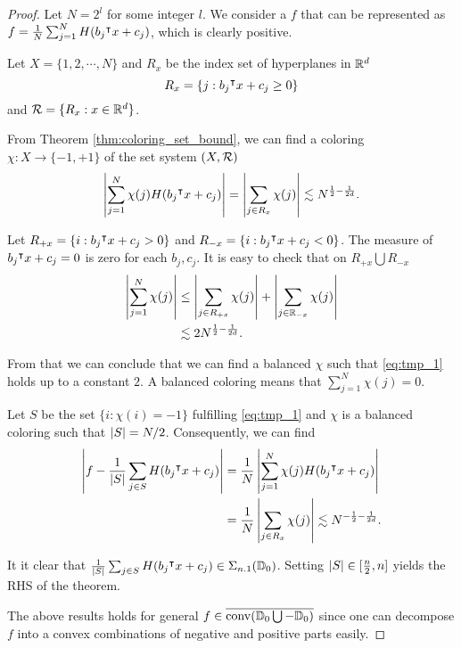 \begin{proof}
    Let $N = 2^l$ for some integer $l$. We consider a $f$ that can be
    represented as $f = \frac{1}{N}\sum_{j=1}^N H(b_j{}^{\intercal} x + c_j)$, which is
    clearly positive.

    Let $X=\{1,2,\cdots,N\}$ and $R_x$   be the index set of hyperplanes in $\mathbb{R}^d$
    \begin{equation}
        R_x = \{j: b_j{}^{\intercal} x+c_j \geq 0\}
    \end{equation}
    and $\mathcal{R} = \{R_x: x\in\mathbb{R}^d\}$.

    From Theorem \ref{thm:coloring_set_bound}, we can find a coloring $\chi: X
    \to \{-1,+1\}$ of the set system $(X, \mathcal{R})$
    \begin{equation}
        \label{eq:tmp_1}
        \left| \sum_{j=1}^N \chi(j) H(b_j{}^{\intercal} x + c_j) \right| = 
        \left| \sum_{j\in R_x} \chi(j) \right| \lesssim N^{\frac{1}{2}-\frac{1}{2d}}.
    \end{equation}

    Let $R_{+x} = \{i: b_j{}^{\intercal} x + c_j > 0\}$ and $R_{-x} = \{i: b_j{}^{\intercal} x + c_j <
    0\}$. The measure of $b_j{}^{\intercal} x + c_j = 0$ is zero for each $b_j, c_j$. It is
    easy to check that on $R_{+x} \bigcup R_{-x}$ 
    \begin{align}
        \left| \sum_{j=1}^N \chi(j) \right| 
        &\leq \left| \sum_{j\in R_{+x}} \chi(j) \right| + 
        \left| \sum_{j\in\mathbb{R}_{-x}} \chi(j) \right| \\
        &\lesssim 2 N^{\frac{1}{2}-\frac{1}{2d}}.
    \end{align}

    From that we can conclude that we can find a balanced $\chi$ such that
    \eqref{eq:tmp_1} holds up to a constant $2$. A balanced coloring means that
    $\sum_{j=1}^N \chi(j) = 0$.

    Let $S$ be the set $\{i: \chi(i) = -1\}$ fulfilling \eqref{eq:tmp_1} and
    $\chi$ is a balanced coloring such that $\left| S \right|=N/2$. Consequently, we can
    find 
    \begin{align}
        \left| f - \frac{1}{\left| S \right|}\sum_{j\in S}H(b_j{}^{\intercal} x+c_j) \right|
        &= \frac{1}{N} \left| \sum_{j=1}^N\chi(j) H(b_j{}^{\intercal} x + c_j) \right| \\
        &= \frac{1}{N} \left| \sum_{j\in R_x} \chi(j) \right| 
        \lesssim N^{-\frac{1}{2}- \frac{1}{2d}}.
    \end{align}

    It it clear that $\frac{1}{\left| S \right|}\sum_{j\in S}H(b_j{}^{\intercal} x+c_j) \in
    \Sigma_{n.1}(\mathbb{D}_0)$. Setting $\left| S \right| \in [\frac{n}{2}, n]$ yields the
    RHS of the theorem.

    The above results holds for general $f \in \overline{\operatorname*{conv}({\mathbb{D}_0} \bigcup -{\mathbb{D}_0})}$
    since one can decompose $f$ into a convex combinations of negative and
    positive parts easily.
\end{proof}


